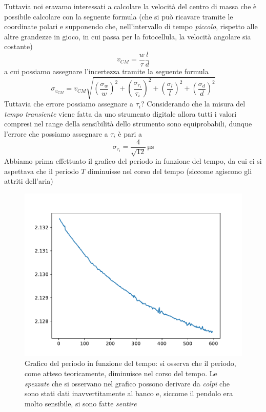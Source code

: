 \documentclass{article}
\begin{document}
\noindent Tuttavia noi eravamo interessati a calcolare la velocità del centro di massa che è possibile calcolare con la seguente formula (che si può ricavare tramite le coordinate polari e supponendo che, nell'intervallo di tempo \emph{piccolo}, rispetto alle altre grandezze in gioco, in cui passa per la fotocellula, la velocità angolare sia costante)
\begin{equation}
	v_{CM} = \frac{w}{\tau}\frac{l}{d}
\end{equation}
a cui possiamo assegnare l'incertezza tramite la seguente formula
\begin{equation}
	\sigma_{v_{CM}} = v_{CM} \sqrt{ \left( \frac{\sigma_w}{w} \right)^2 + \left( \frac{\sigma_{\tau_i}}{\tau_i} \right)^2 + \left( \frac{\sigma_l}{l} \right)^2 + \left( \frac{\sigma_d}{d} \right)^2}
\end{equation}
Tuttavia che errore possiamo assegnare a $\tau_i$? Considerando che la misura del \emph{tempo transiente} viene fatta da uno strumento digitale allora tutti i valori compresi nel range della sensibilità dello strumento sono equiprobabili, dunque l'errore che possiamo assegnare a $\tau_i$ è pari a
$$
	\sigma_{\tau_i} = \frac{4}{\sqrt{12}} \, \si{\micro\second}
$$
Abbiamo prima effettuato il grafico del periodo in funzione del tempo, da cui ci si aspettava che il periodo $T$ diminuisse nel corso del tempo (siccome agiscono gli attriti dell'aria)
\begin{figure}[H]
	\centering
	\includegraphics[scale=0.45]{Grafico_periodo_tempo.pdf}
	\caption{Grafico del periodo in funzione del tempo: si osserva che il periodo, come atteso teoricamente, diminuisce nel corso del tempo. Le \emph{spezzate} che si osservano nel grafico possono derivare da \emph{colpi} che sono stati dati inavvertitamente al banco e, siccome il pendolo era molto sensibile, si sono fatte \emph{sentire} }
\end{figure}
\end{document}
